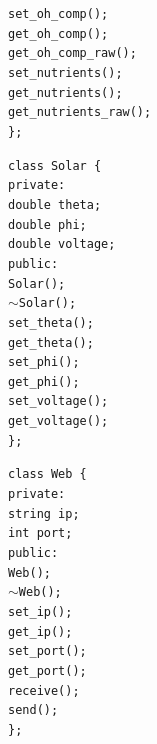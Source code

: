 \begin{flushleft}
\begin{flushleft}
        \quad\quad\texttt{set\_oh\_comp();} \\
        \quad\quad\texttt{get\_oh\_comp();} \\
        \quad\quad\texttt{get\_oh\_comp\_raw();} \\
        \quad\quad\texttt{set\_nutrients();} \\
        \quad\quad\texttt{get\_nutrients();} \\
        \quad\quad\texttt{get\_nutrients\_raw();} \\
        \texttt{\};} \\
    \end{flushleft}
    \begin{flushleft}
        \texttt{class Solar \{}  \\
        \quad\texttt{private:} \\
        \quad\quad\texttt{double theta;} \\
        \quad\quad\texttt{double phi;} \\
        \quad\quad\texttt{double voltage;} \\
        \quad\texttt{public:} \\
        \quad\quad\texttt{Solar();} \\
        \quad\quad\texttt{$\sim$Solar();} \\
        \quad\quad\texttt{set\_theta();} \\
        \quad\quad\texttt{get\_theta();} \\
        \quad\quad\texttt{set\_phi();} \\
        \quad\quad\texttt{get\_phi();} \\
        \quad\quad\texttt{set\_voltage();} \\
        \quad\quad\texttt{get\_voltage();} \\
        \texttt{\};} \\
    \end{flushleft}
    \begin{flushleft}
        \texttt{class Web \{}  \\
        \quad\texttt{private:} \\
        \quad\quad\texttt{string ip;} \\
        \quad\quad\texttt{int port;} \\
        \quad\texttt{public:} \\
        \quad\quad\texttt{Web();} \\
        \quad\quad\texttt{$\sim$Web();} \\
        \quad\quad\texttt{set\_ip();} \\
        \quad\quad\texttt{get\_ip();} \\
        \quad\quad\texttt{set\_port();} \\
        \quad\quad\texttt{get\_port();} \\
        \quad\quad\texttt{receive();} \\
        \quad\quad\texttt{send();} \\
        \texttt{\};} \\
    \end{flushleft}
\end{flushleft}
